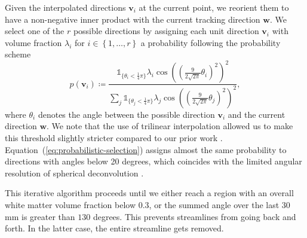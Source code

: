 
Given the interpolated directions $\mathbf{v}_i$ at the current point, we
reorient them to have a non-negative inner product with the current tracking
direction $\mathbf{w}$. We select one of the $r$ possible directions by assigning each unit direction $\mathbf{v}_i$ with volume fraction
$\lambda_i$ for $i \in \left\{ 1 , \dots , r \right\}$ a probability following the probability
scheme
\begin{equation}
  \label{eq:probabilistic-selection}
	p \left( \mathbf{v}_i \right) \coloneqq \frac{ \mathbb{1}_{\lbrace\theta_i <
		\frac{1}{4} \pi \rbrace} \lambda_i \cos \left( \left( \frac{9}{2\sqrt{2
\pi}} \theta_i \right)^2 \right)^2}{\sum_j \mathbb{1}_{\lbrace\theta_j <
		\frac{1}{4} \pi \rbrace} \lambda_j \cos \left( \left( \frac{9}{2\sqrt{2
\pi}} \theta_j \right)^2 \right)^2 },   
\end{equation}
where $\theta_i$ denotes the angle between the possible direction $\mathbf{v}_i$
and the current direction $\mathbf{w}$.  We note that the use of trilinear interpolation allowed us to make this threshold slightly stricter compared to our prior work \cite{Gruen:2021}.
%
Equation~(\ref{eq:probabilistic-selection}) assigns almost the same probability to directions with angles below 20 degrees, which coincides with the limited angular resolution of
spherical deconvolution \cite{TOURNIER20071459}. 

This iterative algorithm proceeds until we either reach a region with an overall white matter volume fraction below $0.3$, or the summed angle over the last $30$ mm is greater than
$130$ degrees. This prevents streamlines from going back and forth. In the latter case,
the entire streamline gets removed. 

